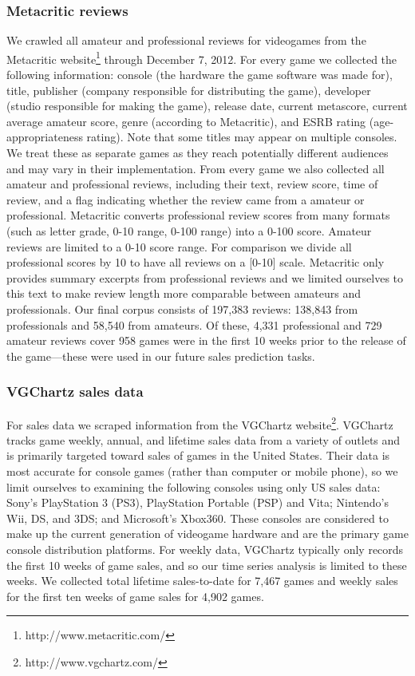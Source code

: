 \documentclass[letterpaper]{article}
\begin{document}
\subsubsection{Metacritic reviews}
We crawled all amateur and professional reviews for videogames from the Metacritic website\footnote{http://www.metacritic.com/} through December 7, 2012. 
For every game we collected the following information: console (the hardware the game software was made for), title, publisher (company responsible for distributing the game), developer (studio responsible for making the game), release date, current metascore, current average amateur score, genre (according to Metacritic), and ESRB rating (age-appropriateness rating). Note that some titles may appear on multiple consoles. We treat these as separate games as they reach potentially different audiences and may vary in their implementation. From every game we also collected all amateur and professional reviews, including their text, review score, time of review, and a flag indicating whether the review came from a amateur or professional. Metacritic converts professional review scores from many formats (such as letter grade, 0-10 range, 0-100 range) into a 0-100 score. Amateur reviews are limited to a 0-10 score range. For comparison we divide all professional scores by 10 to have all reviews on a [0-10] scale. Metacritic only provides summary excerpts from professional reviews and we limited ourselves to this text to make review length more comparable between amateurs and professionals. Our final corpus consists of 197,383 reviews: 138,843 from professionals and 58,540 from amateurs. Of these, 4,331 professional and 729 amateur reviews cover 958 games were in the first 10 weeks prior to the release of the game---these were used in our future sales prediction tasks.

\subsubsection{VGChartz sales data}
For sales data we scraped information from the VGChartz website\footnote{http://www.vgchartz.com/}. VGChartz tracks game weekly, annual, and lifetime sales data from a variety of outlets and is primarily targeted toward sales of games in the United States. Their data is most accurate for console games (rather than computer or mobile phone), so we limit ourselves to examining the following consoles using only US sales data: Sony's PlayStation 3 (PS3), PlayStation Portable (PSP) and Vita; Nintendo's Wii, DS, and 3DS; and Microsoft's Xbox360. These consoles are considered to make up the current generation of videogame hardware and are the primary game console distribution platforms. For weekly data, VGChartz typically only records the first 10 weeks of game sales, and so our time series analysis is limited to these weeks. We collected total lifetime sales-to-date for 7,467 games and weekly sales for the first ten weeks of game sales for 4,902 games.
\end{document}

